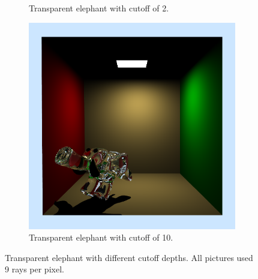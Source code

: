\begin{figure}[h]
\begin{subfigure}[b]{0.3\textwidth}
		\caption{Transparent elephant with cutoff of 2.}
	\end{subfigure}
	\begin{subfigure}[b]{0.3\textwidth}
		\includegraphics[width=\textwidth]{week3/elephant_10_9rpp.png}
		\caption{Transparent elephant with cutoff of 10.}
	\end{subfigure}
	
	\caption{Transparent elephant with different cutoff depths. All pictures used 9 rays per pixel.}
	\label{fig:transparentelephants}
 \end{figure}
 
